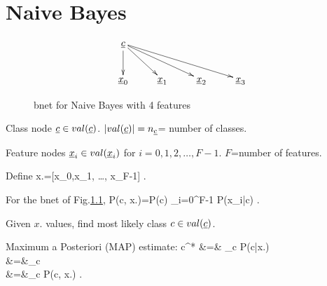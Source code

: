 \chapter{Naive Bayes}\label{ch-naive}

\begin{figure}[h!]
\centering
$$\xymatrix{
\rvc\ar[d]\ar[dr]\ar[drr]\ar[drrr]\\
\rvx_0&\rvx_1&\rvx_2&\rvx_3
}$$
\caption{bnet for Naive Bayes
with 4 features}
\label{fig-naive}
\end{figure}
Class node $\rvc\in val(\rvc)$. $|val(\rvc)|=n_\rvc$=
number of classes.

Feature nodes $\rvx_i\in val(\rvx_i)$ for
$i=0, 1, 2, \ldots, F-1$. $F$=number of
features.

Define
\beq
x.=[x_0,x_1, \ldots, x_{F-1}]
\;.
\eeq

For the bnet of Fig.\ref{fig-naive},
\beq
P(c, x.)=P(c)
\prod_{i=0}^{F-1}
P(x_i|c)
\;.
\eeq

Given $x.$ values, 
find most likely class $c\in val(\rvc)$.

Maximum a Posteriori (MAP) estimate:
\beqa
c^* &=& \argmax_c P(c|x.)\\
&=&\argmax_c \\
&=&\argmax_c P(c, x.)
\;.
\eeqa
